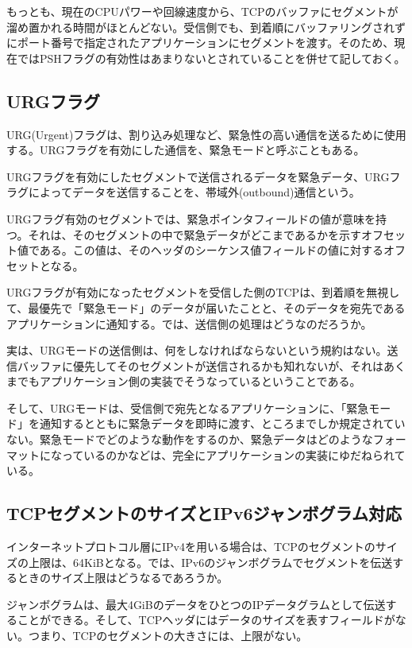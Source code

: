 もっとも、現在のCPUパワーや回線速度から、TCPのバッファにセグメントが溜め置かれる時間がほとんどない。受信側でも、到着順にバッファリングされずにポート番号で指定されたアプリケーションにセグメントを渡す。そのため、現在ではPSHフラグの有効性はあまりないとされていることを併せて記しておく。

\subsection{URGフラグ}
URG(Urgent)フラグは、割り込み処理など、緊急性の高い通信を送るために使用する。URGフラグを有効にした通信を、緊急モードと呼ぶこともある。

URGフラグを有効にしたセグメントで送信されるデータを緊急データ、URGフラグによってデータを送信することを、帯域外(outbound)通信という。

URGフラグ有効のセグメントでは、緊急ポインタフィールドの値が意味を持つ。それは、そのセグメントの中で緊急データがどこまであるかを示すオフセット値である。この値は、そのヘッダのシーケンス値フィールドの値に対するオフセットとなる。

URGフラグが有効になったセグメントを受信した側のTCPは、到着順を無視して、最優先で「緊急モード」のデータが届いたことと、そのデータを宛先であるアプリケーションに通知する。では、送信側の処理はどうなのだろうか。

実は、URGモードの送信側は、何をしなければならないという規約はない。送信バッファに優先してそのセグメントが送信されるかも知れないが、それはあくまでもアプリケーション側の実装でそうなっているということである。

そして、URGモードは、受信側で宛先となるアプリケーションに、「緊急モード」を通知するとともに緊急データを即時に渡す、ところまでしか規定されていない。緊急モードでどのような動作をするのか、緊急データはどのようなフォーマットになっているのかなどは、完全にアプリケーションの実装にゆだねられている。

\subsection{TCPセグメントのサイズとIPv6ジャンボグラム対応}

インターネットプロトコル層にIPv4を用いる場合は、TCPのセグメントのサイズの上限は、64KiBとなる。では、IPv6のジャンボグラムでセグメントを伝送するときのサイズ上限はどうなるであろうか。

ジャンボグラムは、最大4GiBのデータをひとつのIPデータグラムとして伝送することができる。そして、TCPヘッダにはデータのサイズを表すフィールドがない。つまり、TCPのセグメントの大きさには、上限がない。

